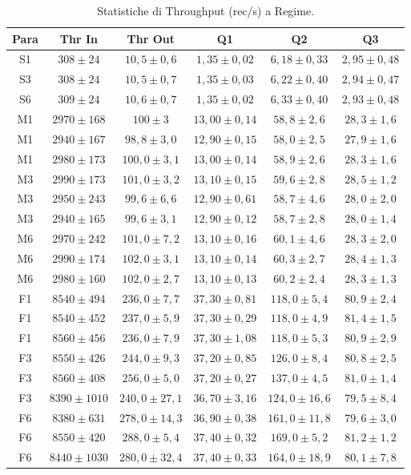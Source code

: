 \documentclass[conference]{IEEEtran}
\begin{document}
\begin{table}[htbp]
\centering
\caption{Statistiche di Throughput (rec/s) a Regime.}
\label{tab:steady_stats}
\footnotesize
\setlength{\tabcolsep}{4pt}
\begin{tabular}{cccccc}
\hline
\textbf{Para} & \textbf{Thr In} & \textbf{Thr Out} & \textbf{Q1} & \textbf{Q2} & \textbf{Q3} \\
\hline
S1 & $308 \pm 24$ & $10,5 \pm 0,6$ & $1,35 \pm 0,02$ & $6,18 \pm 0,33$ & $2,95 \pm 0,48$ \\
S3 & $308 \pm 24$ & $10,5 \pm 0,7$ & $1,35 \pm 0,03$ & $6,22 \pm 0,40$ & $2,94 \pm 0,47$ \\
S6 & $309 \pm 24$ & $10,6 \pm 0,7$ & $1,35 \pm 0,02$ & $6,33 \pm 0,40$ & $2,93 \pm 0,48$ \\
\hline
M1 & $2970 \pm 168$ & $100 \pm 3$ & $13,00 \pm 0,14$ & $58,8 \pm 2,6$ & $28,3 \pm 1,6$ \\
M1 & $2940 \pm 167$ & $98,8 \pm 3,0$ & $12,90 \pm 0,15$ & $58,0 \pm 2,5$ & $27,9 \pm 1,6$ \\
M1 & $2980 \pm 173$ & $100,0 \pm 3,1$ & $13,00 \pm 0,14$ & $58,9 \pm 2,6$ & $28,3 \pm 1,6$ \\
M3 & $2990 \pm 173$ & $101,0 \pm 3,2$ & $13,10 \pm 0,15$ & $59,6 \pm 2,8$ & $28,5 \pm 1,2$ \\
M3 & $2950 \pm 243$ & $99,6 \pm 6,6$ & $12,90 \pm 0,61$ & $58,7 \pm 4,6$ & $28,0 \pm 2,0$ \\
M3 & $2940 \pm 165$ & $99,6 \pm 3,1$ & $12,90 \pm 0,12$ & $58,7 \pm 2,8$ & $28,0 \pm 1,4$ \\
M6 & $2970 \pm 242$ & $101,0 \pm 7,2$ & $13,10 \pm 0,16$ & $60,1 \pm 4,6$ & $28,3 \pm 2,0$ \\
M6 & $2990 \pm 174$ & $102,0 \pm 3,1$ & $13,10 \pm 0,14$ & $60,3 \pm 2,7$ & $28,4 \pm 1,3$ \\
M6 & $2980 \pm 160$ & $102,0 \pm 2,7$ & $13,10 \pm 0,13$ & $60,2 \pm 2,4$ & $28,3 \pm 1,3$ \\
\hline
F1 & $8540 \pm 494$ & $236,0 \pm 7,7$ & $37,30 \pm 0,81$ & $118,0 \pm 5,4$ & $80,9 \pm 2,4$ \\
F1 & $8540 \pm 452$ & $237,0 \pm 5,9$ & $37,30 \pm 0,29$ & $118,0 \pm 4,9$ & $81,4 \pm 1,5$ \\
F1 & $8560 \pm 456$ & $236,0 \pm 7,9$ & $37,30 \pm 1,08$ & $118,0 \pm 5,3$ & $80,9 \pm 2,9$ \\
F3 & $8550 \pm 426$ & $244,0 \pm 9,3$ & $37,20 \pm 0,85$ & $126,0 \pm 8,4$ & $80,8 \pm 2,5$ \\
F3 & $8560 \pm 408$ & $256,0 \pm 5,0$ & $37,20 \pm 0,27$ & $137,0 \pm 4,5$ & $81,0 \pm 1,4$ \\
F3 & $8390 \pm 1010$ & $240,0 \pm 27,1$ & $36,70 \pm 3,16$ & $124,0 \pm 16,6$ & $79,5 \pm 8,4$ \\
F6 & $8380 \pm 631$ & $278,0 \pm 14,3$ & $36,90 \pm 0,38$ & $161,0 \pm 11,8$ & $79,6 \pm 3,0$ \\
F6 & $8550 \pm 420$ & $288,0 \pm 5,4$ & $37,40 \pm 0,32$ & $169,0 \pm 5,2$ & $81,2 \pm 1,2$ \\
F6 & $8440 \pm 1030$ & $280,0 \pm 32,4$ & $37,40 \pm 0,33$ & $164,0 \pm 18,9$ & $80,1 \pm 7,8$ \\
\hline
\end{tabular}
\end{table}
\end{document}
